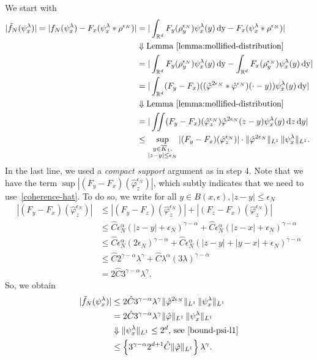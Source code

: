 We start with
\begin{align*}
    |\tilde f_N (\psi^\lambda_x) |
    = |f_N(\psi^\lambda_x) - F_x(\psi^\lambda_x * \rho^{\epsilon_N}) |
    &= |\int_{\mathbb{R}^d} F_y(\rho_y^{\epsilon_N}) \psi^{\lambda}_x(y) \, \mathrm{dy} - F_x(\psi^\lambda_x * \rho^{\epsilon_N})| \\
    &\Downarrow \text{Lemma \ref{lemma:mollified-distribution}} \\
    &= |\int_{\mathbb{R}^d} F_y(\rho_y^{\epsilon_N}) \psi^{\lambda}_x(y) \, \mathrm{dy} - \int_{\mathbb{R}^d} F_x(\rho_y^{\epsilon_N}) \psi^{\lambda}_x(y) \, \mathrm{dy}| \\
    &= |\int_{\mathbb{R}^d} (F_y - F_x)((\hat \varphi^{2\epsilon_N} * \hat \varphi^{\epsilon_N})(\cdot - y)) \psi^{\lambda}_x(y) \, \mathrm{dy}|\\
    &\Downarrow \text{Lemma \ref{lemma:mollified-distribution}} \\
    &= |\iint (F_y - F_x)(\hat \varphi^{\epsilon_N}_z) \hat \varphi^{2 \epsilon_N}(z-y)\psi^\lambda_x(y) \, \mathrm{d}z \, \mathrm{d}y| \\
    &\leq\sup_{\substack{y \in \overline K_1,\\|z-y|\leq\epsilon_N}} |(F_y - F_x)(\hat \varphi^{\epsilon_N}_z)| \cdot \lVert \hat \varphi^{2\epsilon_N}\rVert_{L^1} \, \lVert \psi^{\lambda}_x\rVert_{L^1}.
\end{align*}
In the last line, we used a \emph{compact support} argument as in step 4. Note that we have the term \(\sup|(F_y - F_x)(\hat \varphi^{\epsilon_N}_z)|\), which subtly indicates that we need to use~\eqref{coherence-hat}. To do so, we write for all \(y \in  B(x,\epsilon),|z-y|\leq\epsilon_N\)
\begin{align*}
    |(F_y - F_x)(\hat \varphi^{\epsilon_N}_z)| &\leq |(F_y - F_z)(\hat \varphi^{\epsilon_N}_z)| + |(F_z - F_x)(\hat \varphi^{\epsilon_N}_z)| \\
    &\leq \hat C \epsilon_N^\alpha(|z-y| + \epsilon_N)^{\gamma - \alpha} + \hat C \epsilon_N^\alpha(|z-x| + \epsilon_N)^{\gamma - \alpha} \\
    &\leq \hat C \epsilon_N^\alpha (2\epsilon_N)^{\gamma - \alpha} + \hat C \epsilon_N^\alpha (|z-y| + |y-x| + \epsilon_N)^{\gamma - \alpha} \\
    &\leq \hat C  2^{\gamma - \alpha} \lambda^{\gamma} +  \hat C  \lambda^\alpha(3\lambda)^{\gamma - \alpha} \\
    &= 2 \hat C 3^{\gamma - \alpha}\lambda^\gamma.
\end{align*}
So, we obtain
\begin{align*}
    |\tilde f_N (\psi^\lambda_x) | 
    &\leq 2 \hat C 3^{\gamma - \alpha}\lambda^\gamma \lVert \hat \varphi^{2\epsilon_N}\rVert_{L^1} \, \lVert \psi^{\lambda}_x\rVert_{L^1}\\
     &= 2 \hat C 3^{\gamma - \alpha}\lambda^\gamma \lVert \hat \varphi\rVert_{L^1} \, \lVert \psi^{\lambda}_x\rVert_{L^1} \\
     &\Downarrow \text{\(\lVert \psi^{\lambda}_x\rVert_{L^1} \leq 2^d\), see~\eqref{bound-psi-l1}} \\
     &\leq \left \{ 3^{\gamma - \alpha} 2^{d+1} \hat C  \lVert \hat \varphi\rVert_{L^1} \right \} \lambda^\gamma.
\end{align*}

